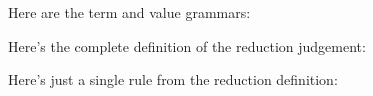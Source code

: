 \documentclass[11pt]{article}
\begin{document}
Here are the term and value grammars:

\ottgrammartabular{
\ottterm\ottinterrule
\ottval%
\ottafterlastrule
}

Here's the complete definition of the reduction judgement:

\ottdefnreduce{}

Here's just a single rule from the reduction definition:

\ottusedrule{\ottdrulectxXXappXXarg{}}
\end{document}
